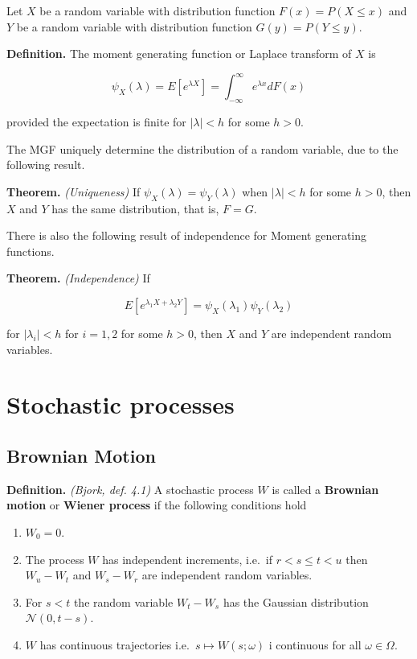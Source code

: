 \documentclass[
]{article}
\providecommand{\tightlist}{%
  \setlength{\itemsep}{0pt}\setlength{\parskip}{0pt}}
\begin{document}
Let \(X\) be a random variable with distribution function
\(F(x)=P(X\le x)\) and \(Y\) be a random variable with distribution
function \(G(y)=P(Y\le y)\).

\textbf{Definition.} The moment generating function or Laplace transform
of \(X\) is

\[\psi_X(\lambda)=E\left[e^{\lambda X}\right]=\int_{-\infty}^\infty e^{\lambda x}dF(x)\]

provided the expectation is finite for \(\vert\lambda\vert<h\) for some
\(h>0\).

The MGF uniquely determine the distribution of a random variable, due to
the following result.

\textbf{Theorem.} \emph{(Uniqueness)} If
\(\psi_X(\lambda)=\psi_Y(\lambda)\) when \(\vert\lambda\vert<h\) for
some \(h>0\), then \(X\) and \(Y\) has the same distribution, that is,
\(F=G\).

There is also the following result of independence for Moment generating
functions.

\textbf{Theorem.} \emph{(Independence)} If

\[E\left[e^{\lambda_1X+\lambda_2Y}\right]=\psi_X(\lambda_1)\psi_Y(\lambda_2)\]

for \(\vert\lambda_i\vert<h\) for \(i=1,2\) for some \(h>0\), then \(X\)
and \(Y\) are independent random variables.

\hypertarget{stochastic-processes}{%
\section{Stochastic processes}\label{stochastic-processes}}

\hypertarget{brownian-motion}{%
\subsection{Brownian Motion}\label{brownian-motion}}

\textbf{Definition.} \emph{(Bjork, def. 4.1)} A stochastic process \(W\)
is called a \textbf{Brownian motion} or \textbf{Wiener process} if the
following conditions hold

\begin{enumerate}
\def\labelenumi{\arabic{enumi}.}
\tightlist
\item
  \(W_0=0\).
\item
  The process \(W\) has independent increments, i.e.~if \(r<s\le t< u\)
  then \(W_u-W_t\) and \(W_s-W_r\) are independent random variables.
\item
  For \(s<t\) the random variable \(W_t-W_s\) has the Gaussian
  distribution \(\mathcal{N}(0,t-s)\).
\item
  \(W\) has continuous trajectories i.e.~\(s\mapsto W(s;\omega)\) i
  continuous for all \(\omega \in\Omega\).
\end{enumerate}
\end{document}
